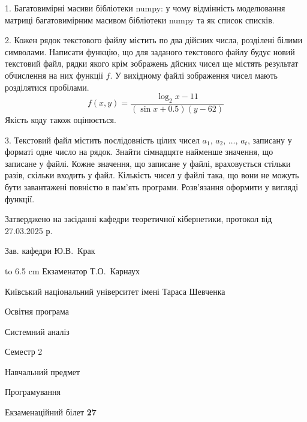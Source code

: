 \documentclass[12pt, ukrainian]{article}
\begin{document}
{%
1. Багатовимірні масиви бібліотеки numpy: у чому відмінність моделювання матриці багатовимірним масивом бібліотеки numpy та як список списків.%
\par
\vspace{2mm}

2. Кожен рядок текстового файлу містить по два дійсних числа, розділені білими символами.
Написати функцію, що для заданого текстового файлу будує новий текстовий файл, рядки якого крім зображень дйсних чисел ще містять результат обчислення на них функції $f$. У вихідному файлі зображення чисел мають розділятися пробілами. 
$$f(x, y) =\frac{\log_{2} x - 11}{(\sin x + 0.5) (y - 62)}$$ 
Якість коду також оцінюється.

\par
\vspace{2mm}

3. Текстовий файл містить послідовність цілих чисел $a_1$, $a_2$, $\ldots$, $a_t$, записану у форматі одне число на рядок. Знайти сімнадцяте найменше значення, що записане у файлі. Кожне значення, що записане у файлі, враховується стільки разів, скільки входить у файл. Кількість чисел у файлі така, що вони не можуть бути завантажені повністю в пам'ять програми. Розв'язання оформити у вигляді функції.

}
{\smallskip\smallskip \begin {scriptsize} Затверджено на засіданні кафедри теоретичної кібернетики, протокол   від   27.03.2025 р.\par\smallskip\smallskip\smallskip\smallskip
{\parbox {6.5 cm} {Зав. кафедри \dotfill Ю.В.~Крак}}\hspace {0.7cm} {\hbox to 6.5 cm { Екзаменатор \dotfill Т.О.~Карнаух}} \end{scriptsize}}
\newpage
{{\begin {scriptsize}\par
{ \center  Київський національний університет імені Тараса Шевченка \par}
{\parbox {5 cm}{Освітня програма \hfill}{\parbox {7 cm}{Системний аналіз\hfill}}\parbox {6 cm}{\hfill Семестр 2}}\par
{\parbox {5 cm} {Навчальний предмет \hfill}\parbox {7 cm}{Програмування \hfill}\parbox {6cm}{\hfill}\par}\vspace{-15pt} \end{scriptsize}}{\center Екзаменаційний білет \No \textbf { 27 }\par}}
\end{document}
